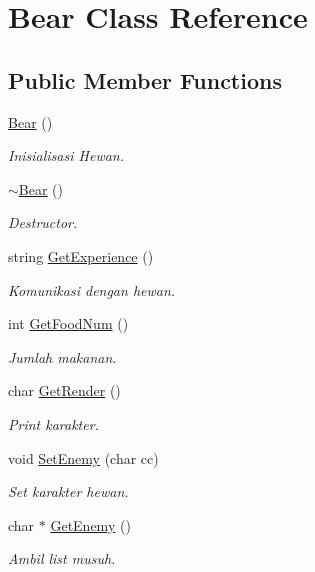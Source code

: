 \hypertarget{class_bear}{}\section{Bear Class Reference}
\label{class_bear}
\subsection*{Public Member Functions}
\begin{DoxyCompactItemize}
\item 
\hyperlink{class_bear_a639d2d41ec84454055f7b44f23c39639}{Bear} ()\hypertarget{class_bear_a639d2d41ec84454055f7b44f23c39639}{}\label{class_bear_a639d2d41ec84454055f7b44f23c39639}

\begin{DoxyCompactList}\small\item\em Inisialisasi Hewan. \end{DoxyCompactList}\item 
\hyperlink{class_bear_aa76f45b1665a93512b04af11a0346b4f}{$\sim$\+Bear} ()\hypertarget{class_bear_aa76f45b1665a93512b04af11a0346b4f}{}\label{class_bear_aa76f45b1665a93512b04af11a0346b4f}

\begin{DoxyCompactList}\small\item\em Destructor. \end{DoxyCompactList}\item 
string \hyperlink{class_bear_a2df1a07339534654f35de034ea3dafcb}{Get\+Experience} ()\hypertarget{class_bear_a2df1a07339534654f35de034ea3dafcb}{}\label{class_bear_a2df1a07339534654f35de034ea3dafcb}

\begin{DoxyCompactList}\small\item\em Komunikasi dengan hewan. \end{DoxyCompactList}\item 
int \hyperlink{class_bear_a4b57abf5bb55df3b222af850f5d033d7}{Get\+Food\+Num} ()
\begin{DoxyCompactList}\small\item\em Jumlah makanan. \end{DoxyCompactList}\item 
char \hyperlink{class_bear_a2d653d61990d3d72393ceaee126347d6}{Get\+Render} ()
\begin{DoxyCompactList}\small\item\em Print karakter. \end{DoxyCompactList}\item 
void \hyperlink{class_bear_a7506c9aca8c458184e92b51747602799}{Set\+Enemy} (char cc)
\begin{DoxyCompactList}\small\item\em Set karakter hewan. \end{DoxyCompactList}\item 
char $\ast$ \hyperlink{class_bear_aacb1d0bd094175bdb2105f22c5639e13}{Get\+Enemy} ()
\begin{DoxyCompactList}\small\item\em Ambil list musuh. \end{DoxyCompactList}\end{DoxyCompactItemize}
